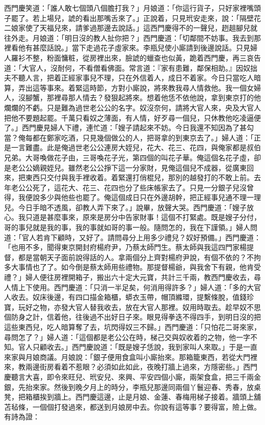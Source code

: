 \begin{showcontents}{}
西門慶笑道：「誰人敢七個頭八個膽打我？」月娘道：「你這行貨子，只好家裡嘴頭子罷了。若上場兒，諕的看出那嘴舌來了。」正說着，只見玳安走來，說：「隔壁花二娘家使了天福兒來，請爹過那邊去說話。」這西門慶得不的一聲兒，趔趄腳兒就往外走。月娘道：「明日沒的教人扯你把？」西門慶道：「切鄰間不妨事。我去到那裡看他有甚麼話說。」當下走過花子虛家來。李瓶兒使小廝請到後邊說話。只見婦人羅衫不整，粉面慵粧，從房裡出來，臉諕的蠟查也似黃，跪着西門慶，再三哀告道：「大官人，沒耐何，不看僧看佛面。常言道：『家有患難，鄰保相助。』因奴拙夫不聽人言，把着正經家事兒不理，只在外信着人，成日不着家。今日只當吃人暗算，弄出這等事來。着緊這時節，方對小廝說，將來教我尋人情救他。我一個女婦人，沒腳蟹，那裡尋那人情去？發狠起將來。想着他恁不依他說，拿到東京打的他爛爛的不虧。只是難為過世老公公的名字。奴沒奈何，請將大官人來，央及大官人把他不要題起罷。千萬只看奴之薄面，有人情，好歹尋一個兒，只休教他吃凌逼便了。」西門慶見婦人下禮，連忙道：「嫂子請起來不妨。今日我還不知因為了甚勾當？俺每都在鄭家吃酒，只見幾個做公的人，把哥拿的到東京去了。」婦人道：「正是一言難盡。此是俺過世老公公連房大姪兒，花大、花三、花四，與俺家都是叔伯兄弟。大哥喚做花子由，三哥喚花子光，第四個的叫花子華。俺這個名花子虛，卻是老公公嫡親姪兒。雖然老公公掙下這一分家財，見俺這個兒不成器，從廣東回來，把東西只交付與我手裡收着。着緊還打俏棍兒，那別的越發打的不敢上前。去年老公公死了，這花大、花三、花四也分了些床帳家去了。只見一分銀子兒沒曾得，我便說多少與他些也罷了。俺這個成日只在外邊胡幹，把正經事兒通不理一理兒。今日手暗不透風，卻教人弄下來了。」說畢，放聲大哭。西門慶道：「嫂子放心。我只道是甚麼事來，原來是房分中告家財事！這個不打緊處。既是嫂子分付，哥的事兒就是我的事，我的事就如哥的事一般。隨問怎的，我在下謹領。」婦人問道：「官人若肯下顧時，又好了。請問尋分上用多少禮兒？奴好預備。」西門慶道：「也用不多，聞得東京開封府楊府尹，乃蔡太師門生。蔡太師與我這四門家楊提督，都是當朝天子面前說得話的人。拿兩個分上齊對楊府尹說，有個不依的？不拘多大事情也了了。如今倒是蔡太師用些禮物。那提督楊爺，與我舍下有親，他肯受禮？」婦人便往房裡開箱子，搬出六十定大元寶，共計三千兩，教西門慶收去，尋人情上下使用。西門慶道：「只消一半足矣，何消用得許多？」婦人道：「多的大官人收去。奴床後邊，有四口描金箱櫃，蟒衣玉帶，帽頂縧環，提繫條脫，值錢珍寶，玩好之物，亦發大官人替我收去，放在大官人那裡。奴用時取去。趁早奴不思個防身之計，信着他，往後過不出好日子來。眼見得拳迭不得四手，到明日沒的把這些東西兒，吃人暗算奪了去，坑閃得奴三不歸。」西門慶道：「只怕花二哥來家，尋問怎了？」婦人道：「這個都是老公公在時，梯己交與奴收着的之物，他一字不知。官人只顧收去。」西門慶說道：「既是嫂子恁說，我到家叫人來取。」于是一直來家與月娘商議。月娘說：「銀子便用食盒叫小廝抬來。那箱籠東西，若從大門裡來，教兩邊街房看着不惹眼？必須如此如此，夜晚打牆上過來，方隱密些。」西門慶聽言大喜，即令來旺兒、玳安兒、來興、平安四個小廝，兩架食盒，把三千兩金銀，先抬來家。然後到晚夕月上的時分，李瓶兒那邊同兩個丫鬟迎春、秀春，放桌凳，把箱櫃挨到牆上。西門慶這邊，止是月娘、金蓮、春梅用梯子接着。牆頭上舖苫毡條，一個個打發過來，都送到月娘房中去。你說有這等事？要得富，險上做。有詩為證：


\end{showcontents}
